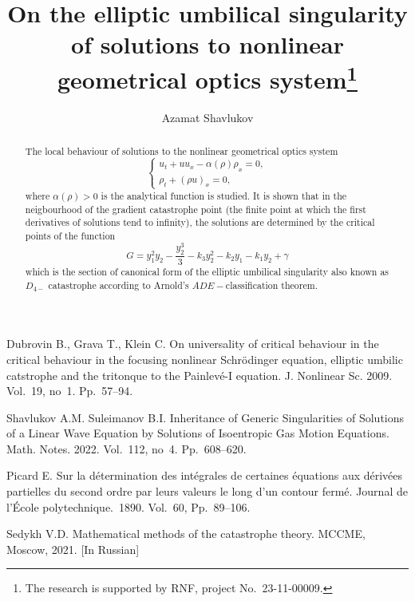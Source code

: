 \documentclass[12pt]{llncs}
\begin{document}
\fi

\title{On the elliptic umbilical singularity of solutions to nonlinear geometrical optics system\thanks{The research is supported by RNF, project No.~23-11-00009.}}

\author{Azamat Shavlukov  
}

\maketitle

\begin{abstract}

The local behaviour of solutions to the nonlinear geometrical optics system
$$\left\{\begin{matrix}
	u_t+u u_x-\alpha(\rho) \rho_x=0,\\
	\rho_t+(\rho u)_x=0,
\end{matrix}\right.$$ where $\alpha(\rho)>0$ is the analytical function is studied. It is shown that in the neigbourhood of the gradient catastrophe point (the finite point at which the first derivatives of solutions tend to infinity), the solutions are determined by the critical points of the function
$$G=y_1^2 y_2-\frac{y_2^3}{3}-k_3 y_2^2-k_2 y_1-k_1 y_2+\gamma$$ which is the section of canonical form of the elliptic umbilical singularity also known as $D_{4-}$ catastrophe according to Arnold's $ADE-$classification theorem.


\end{abstract}



\begin{thebibliography}{9} %
 Dubrovin B., Grava T., Klein C. On universality of critical behaviour in the critical behaviour in the focusing nonlinear Schr\"odinger equation, elliptic umbilic catstrophe and the tritonque to the Painlev\'e-I equation. J. Nonlinear Sc. 2009. Vol.~19, no~1. Pp.~57--94.

  Shavlukov A.M. Suleimanov B.I. Inheritance of Generic Singularities of Solutions of a Linear Wave Equation by Solutions of Isoentropic Gas Motion Equations. Math. Notes. 2022. Vol.~112, no~4. Pp.~608--620.

 Picard E. Sur la détermination des intégrales de certaines équations aux dérivées partielles du second ordre par leurs valeurs le long d'un contour fermé. Journal de l'École polytechnique.~1890. Vol.~60, Pp.~89--106.

  Sedykh V.D. Mathematical methods of the catastrophe theory. MCCME, Moscow, 2021. [In Russian]

\end{thebibliography}
\end{document}
